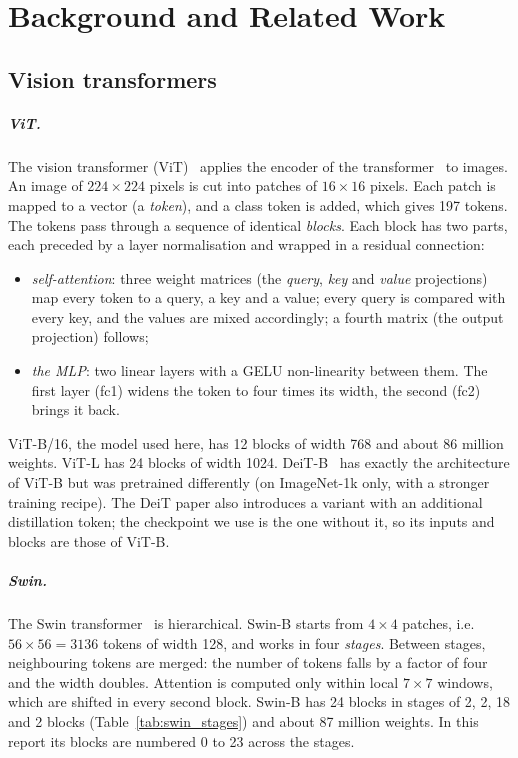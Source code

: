 \chapter{Background and Related Work}
\label{ch:background}

\section{Vision transformers}

\paragraph{ViT.} The vision transformer (ViT)~\cite{dosovitskiy2021vit} applies the encoder of the
transformer~\cite{vaswani2017attention} to images. An image of $224\times224$ pixels is cut into patches of $16\times16$ pixels. Each patch
is mapped to a vector (a \emph{token}), and a class token is added, which gives 197 tokens. The tokens pass through a
sequence of identical \emph{blocks}. Each block has two parts, each preceded by a layer normalisation and wrapped in
a residual connection:
\begin{itemize}
  \item \emph{self-attention}: three weight matrices (the \emph{query}, \emph{key} and \emph{value} projections) map
        every token to a query, a key and a value; every query is compared with every key, and the values are mixed
        accordingly; a fourth matrix (the output projection) follows;
  \item \emph{the MLP}: two linear layers with a GELU non-linearity between them. The first layer (fc1) widens the
        token to four times its width, the second (fc2) brings it back.
\end{itemize}
ViT-B/16, the model used here, has 12 blocks of width 768 and about 86 million weights. ViT-L has 24 blocks of
width 1024. DeiT-B~\cite{touvron2021deit} has exactly the architecture of ViT-B but was pretrained differently (on
ImageNet-1k only, with a stronger training recipe). The DeiT paper also introduces a variant with an additional
distillation token; the checkpoint we use is the one without it, so its inputs and blocks are those of ViT-B.

\paragraph{Swin.} The Swin transformer~\cite{liu2021swin} is hierarchical. Swin-B starts from $4\times4$ patches,
i.e.\ $56\times56 = 3136$ tokens of width 128, and works in four \emph{stages}. Between stages, neighbouring tokens
are merged: the number of tokens falls by a factor of four and the width doubles. Attention is computed only within
local $7\times7$ windows, which are shifted in every second block. Swin-B has 24 blocks in stages of 2, 2, 18 and 2
blocks (Table~\ref{tab:swin_stages}) and about 87 million weights. In this report its blocks are numbered 0 to 23
across the stages.

